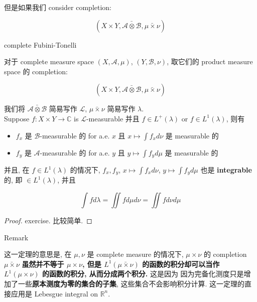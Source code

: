 \documentclass{qlnotes-export}
\begin{document}
但是如果我们 consider completion:

\[(X \times Y,\bar{\mathcal{A}\otimes\mathcal{B}},\bar{\mu\times\nu})\]

\begin{theorem}{complete Fubini-Tonelli}\label{thm-06-product-measure-fubini-tonelli-complete-fubini-tonelli}

对于 complete measure space \((X,\mathcal{A},\mu)\), \((Y,\mathcal{B},\nu)\), 取它们的 product measure space 的 completion:

\[(X \times Y,\bar{\mathcal{A}\otimes\mathcal{B}},\bar{\mu\times\nu})\]

我们将 \(\bar{\mathcal{A}\otimes\mathcal{B}}\) 简易写作 \(\mathcal{L}\), \(\bar{\mu\times\nu}\) 简易写作 \(\lambda\).\\
Suppose \(f:X \times Y\rightarrow{\mathbb{C}}\) is \(\mathcal{L}\)-measurable 并且 \(f \in L^{+}(\lambda)\) or \(f \in L^{1}(\lambda)\), 则有

\begin{itemize}
\item
  \(f_{x}\) 是 \(\mathcal{B}\)-measurable 的 for a.e. \(x\) 且 \(x\mapsto\int f_{x} d\nu\) 是 measurable 的
\item
  \(f_{y}\) 是 \(\mathcal{A}\)-measurable 的 for a.e. \(y\) 且 \(y\mapsto\int f_{y} d\mu\) 是 measurable 的
\end{itemize}

并且, 在 \(f \in L^{1}(\lambda)\) 的情况下, \(f_{x},f_{y}\), \(x\mapsto\int f_{x} d\nu\), \(y\mapsto\int f_{y} d\mu\) 也是 \textbf{integrable} 的, 即 \(\in L^{1}(\lambda)\), 并且

\[\int f d\lambda = \iint f d\mu d\nu = \iint f d\nu d\mu\]

\end{theorem}

\begin{proof}

exercise. 比较简单.

\end{proof}

\begin{qlremark}{Remark}

这一定理的意思是, 在 \(\mu,\nu\) 是 complete measure 的情况下, \(\mu \times \nu\) 的 completion \(\bar{\mu\times\nu}\) \textbf{虽然并不等于 \(\mu \times \nu\), 但是 \(L^{1}(\bar{\mu\times\nu})\) 的函数的积分却可以当作 \(L^{1}(\mu \times \nu)\) 的函数的积分, 从而分成两个积分.} 这是因为 因为完备化测度只是增加了一些\textbf{原本测度为零的集合的子集}, 这些集合不会影响积分计算. 这一定理的直接应用是 Lebesgue integral on \({\mathbb{R}}^{n}\).

\end{qlremark}
\end{document}

